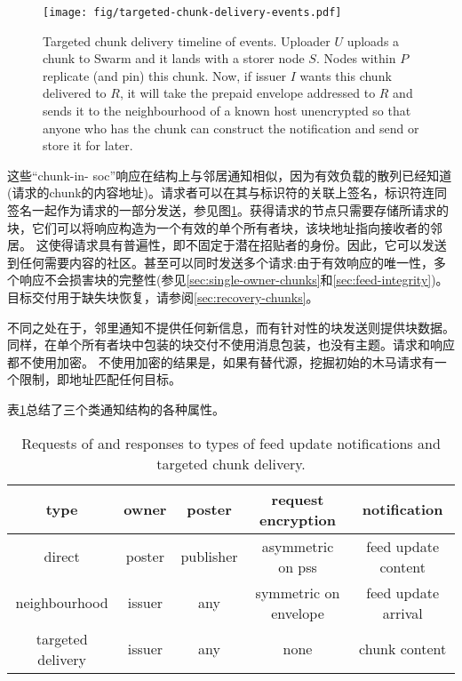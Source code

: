 \begin{figure}[htbp]
\centering
\texttt{[image: fig/targeted-chunk-delivery-events.pdf]}
\caption[Targeted chunk delivery timeline of events\statusgreen]{Targeted chunk delivery timeline of events. Uploader $U$ uploads a chunk to Swarm and it lands with a storer node $S$. Nodes within $P$ replicate (and pin) this chunk. Now, if issuer $I$ wants this chunk delivered to $R$, it will take the prepaid envelope addressed to $R$ and sends it to the neighbourhood of a known host unencrypted so that anyone who has the chunk can construct the notification and send or store it for later.}
\label{fig:targeted-chunk-delivery-events}
\end{figure}



这些“chunk-in- soc”响应在结构上与邻居通知相似，因为有效负载的散列已经知道(请求的chunk的内容地址)。请求者可以在其与标识符的关联上签名，标识符连同签名一起作为请求的一部分发送，参见图\ref{fig:targeted-chunk-delivery-events}。获得请求的节点只需要存储所请求的块，它们可以将响应构造为一个有效的单个所有者块，该块地址指向接收者的邻居。
这使得请求具有普遍性，即不固定于潜在招贴者的身份。因此，它可以发送到任何需要内容的社区。甚至可以同时发送多个请求:由于有效响应的唯一性，多个响应不会损害块的完整性(参见\ref{sec:single-owner-chunks}和\ref{sec:feed-integrity})。目标交付用于缺失块恢复，请参阅\ref{sec:recovery-chunks}。

不同之处在于，邻里通知不提供任何新信息，而有针对性的块发送则提供块数据。同样，在单个所有者块中包装的块交付不使用消息包装，也没有主题。请求和响应都不使用加密。
不使用加密的结果是，如果有替代源，挖掘初始的木马请求有一个限制，即地址匹配任何目标。 

表\ref{tab:notifications}总结了三个类通知结构的各种属性。

\begin{table}[htpb]
    \centering
    \begin{tabular}{c|c|c|c|c|}
    type & owner & poster & request encryption & notification  \\\hline
         direct & poster & publisher & asymmetric on pss & feed update  content\\
         neighbourhood & issuer & any & symmetric on envelope & feed update arrival\\
         targeted delivery & issuer & any & none & chunk content\\
    \end{tabular}
    \caption[Feed update notifications]{Requests of and responses to types of feed update notifications and targeted chunk delivery.}
    \label{tab:notifications}
\end{table}

